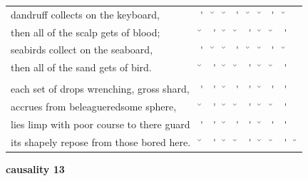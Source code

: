 \documentclass[12pt, landscape]{article}
\begin{document}
\begin{center}
\begin{tabularx}{\textwidth}{
>{\lefting\arraybackslash}X
c
c
c
c
c
c
c
c
c
}

dandruff collects on the keyboard, & \'{} & \u{} & \u{} & \'{} & \u{} & \u{} & \'{} & \u{} & \\
then all of the scalp gets of blood; & \u{} & \'{} & \u{} & \u{} & \'{} & \u{} & \u{} & \'{} & \\
seabirds collect on the seaboard, & \'{} & \u{} & \u{} & \'{} & \u{} & \u{} & \'{} & \u{} & \\
then all of the sand gets of bird. & \u{} & \'{} & \u{} & \u{} & \'{} & \u{} & \u{} & \'{} & \\
 & & & & & & & & \\
each set of drops wrenching, gross shard, & \'{} & \'{} & \u{} & \'{} & \'{} & \u{} & \'{} & \'{} & \\
accrues from beleagueredsome sphere, & \u{} & \'{} & \u{} & \u{} & \'{} & \u{} & \u{} & \'{} & \\
lies limp with poor course to there guard & \'{} & \'{} & \u{} & \'{} & \'{} & \u{} & \'{} & \'{} & \\
its shapely repose from those bored here. & \u{} & \'{} & \u{} & \u{} & \'{} & \u{} & \u{} & \'{} & \u{} \\

\end{tabularx}
\end{center}

\vspace*{\fill}

\newpage

\vspace*{\fill}

\noindent \textbf{causality 13}
\noindent \hfill \par
\end{document}
